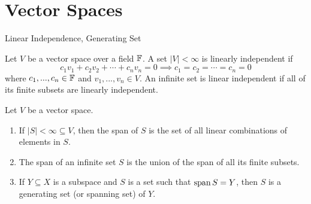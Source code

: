 \documentclass[10pt]{beamer}
\begin{document}
    \section{Vector Spaces}
    \begin{frame}{Linear Independence, Generating Set}
        \begin{definition}
            Let $V$ be a vector space over a field $\mathbb{F}$. A set $|V| < \infty$ is \alert{linearly independent} if 
            \begin{equation*}
                c_1v_1 + c_2v_2 + \cdots + c_nv_n = 0 \implies c_1 = c_2 = \cdots = c_n = 0
            \end{equation*}
            where $c_1, ..., c_n\in\mathbb{F}$ and $v_1, ..., v_n\in V$. An infinite set is linear independent if all of its finite subsets are linearly independent.
        \end{definition}

        \begin{definition}
            Let $V$ be a vector space. 
            \begin{enumerate}
                \item If $|S| < \infty \subseteq V$, then the \alert{span} of $S$ is the set of all linear combinations of elements in $S$. 
                \item The span of an infinite set $S$ is the union of the span of all its finite subsets. 
                \item If $Y \subseteq X$ is a subspace and $S$ is a set such that $\operatorname{span} S = Y$, then $S$ is a \alert{generating set} (or \alert{spanning set}) of $Y$. 
            \end{enumerate}
        \end{definition}
    \end{frame}
\end{document}
